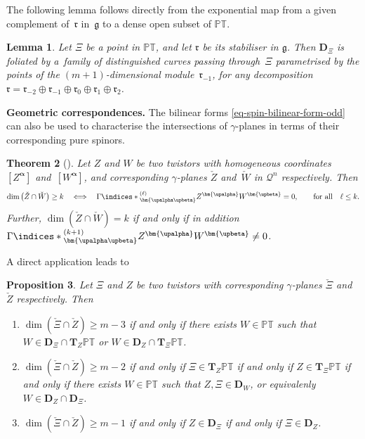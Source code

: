 \documentclass[10pt,a4paper]{amsart}
\numberwithin{equation}{section}
\newtheorem{Theorem}{Theorem}[section]
\newtheorem{Lemma}[Theorem]{Lemma}
\newtheorem{Proposition}[Theorem]{Proposition}
 { \theoremstyle{definition}
\newtheorem{Definition}[Theorem]{Definition}
\newtheorem{Example}[Theorem]{Example}
\newtheorem{Remark}[Theorem]{Remark} }
\newcommand{\mbf} [1]{\mathbf{#1}}
\newcommand{\mc} [1]{\mathcal{#1}}
\newcommand{\ind} {\indices}
\newcommand{\g} {\mathfrak{g}}
\newcommand{\mfr} {\mathfrak{r}}
\newcommand{\PT} {\mathbb{PT}}
\begin{document}
The following lemma follows directly from the exponential map from a given complement of~$\mfr$ in~$\g$ to a dense open subset of $\PT$.

\begin{Lemma}\label{lem-fol-D}
Let $\Xi$ be a point in $\PT$, and let $\mfr$ be its stabiliser in $\g$. Then $\mbf{D}_\Xi$ is foliated by a~family of distinguished curves passing through~$\Xi$ parametrised by the points of the $(m+1)$-dimensional module~$\mfr_{-1}$, for any decomposition $\mfr = \mfr_{-2} \oplus \mfr_{-1} \oplus \mfr_0 \oplus \mfr_1 \oplus \mfr_2$.
\end{Lemma}

{\bf Geometric correspondences.} The bilinear forms \eqref{eq-spin-bilinear-form-odd} can also be used to characterise the intersections of $\gamma$-planes in terms of their corresponding pure spinors.
\begin{Theorem}[\cite{Cartan1981,Harnad1995}]\label{thm-gam-inters}
Let $Z$ and $W$ be two twistors with homogeneous coordinates~$[Z^{\bm{\upalpha}}]$ and~$[W^{\bm{\upalpha}}]$, and corresponding $\gamma$-planes $\check{Z}$ and~$\check{W}$ in $\mc{Q}^n$ respectively. Then
\begin{gather*}
\dim \big( \check{Z} \cap \check{W} \big) \geq k \quad \Longleftrightarrow \quad \Gamma \ind*{^{(\ell)}_{\bm{\upalpha \upbeta}}} Z^{\bm{\upalpha}} W^{\bm{\upbeta}} = 0 , \qquad \mbox{for all} \quad \ell \leq k.
\end{gather*}
Further, $\dim ( \check{Z} \cap \check{W} ) = k$ if and only if in addition $\Gamma \ind*{^{(k+1)}_{\bm{\upalpha \upbeta}}} Z^{\bm{\upalpha}} W^{\bm{\upbeta}} \neq 0$.
\end{Theorem}
A direct application leads to
\begin{Proposition}\label{prop-XiZ}
Let $\Xi$ and $Z$ be two twistors with corresponding $\gamma$-planes $\check{\Xi}$ and $\check{Z}$ respectively. Then
\begin{enumerate}\itemsep=0pt
\item[$1.$] $\dim(\check{\Xi} \cap \check{Z}) \geq m-3$ if and only if there exists $W \in \PT$ such that $W \in \mbf{D}_\Xi \cap \mbf{T}_Z \PT$ or $W \in \mbf{D}_Z \cap \mbf{T}_\Xi \PT$.
\item[$2.$] $\dim(\check{\Xi} \cap \check{Z}) \geq m-2$ if and only if $\Xi \in \mbf{T}_Z \PT$ if and only if $Z \in \mbf{T}_\Xi \PT$ if and only if there exists $W \in \PT$ such that $Z, \Xi \in \mbf{D}_W$, or equivalenly $W \in \mbf{D}_Z \cap \mbf{D}_\Xi$.
\item[$3.$] $\dim(\check{\Xi} \cap \check{Z}) \geq m-1$ if and only if $Z \in \mbf{D}_\Xi$ if and only if $\Xi \in \mbf{D}_Z$.
\end{enumerate}
\end{Proposition}
\end{document}
